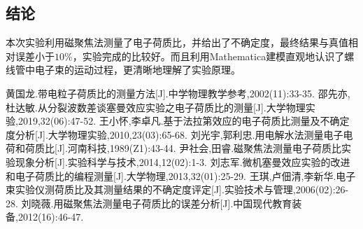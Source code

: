 \documentclass{WHUReport}
\begin{document}
\begin{multicols}{2}
	\section{结\quad 论}
	本次实验利用磁聚焦法测量了电子荷质比，并给出了不确定度，最终结果与真值相对误差小于$10\%$，实验完成的比较好。而且利用Mathematica建模直观地认识了螺线管中电子束的运动过程，更清晰地理解了实验原理。
	
	\begin{thebibliography}{99}  
		黄国龙.带电粒子荷质比的测量方法[J].中学物理教学参考,2002(11):33-35.
		邵先亦,杜达敏.从分裂波数差谈塞曼效应实验之电子荷质比的测量[J].大学物理实验,2019,32(06):47-52.
		王小怀,李卓凡.基于法拉第效应的电子荷质比测量及不确定度分析[J].大学物理实验,2010,23(03):65-68.
		刘光宇,郭利忠.用电解水法测量电子电荷和荷质比[J].河南科技,1989(Z1):43-44.
		尹社会,田睿.磁聚焦法测量电子荷质比实验现象分析[J].实验科学与技术,2014,12(02):1-3.
		刘志军.微机塞曼效应实验的改进和电子荷质比的编程测量[J].大学物理,2013,32(01):25-29.
		王琪,卢佃清,李新华.电子束实验仪测荷质比及其测量结果的不确定度评定[J].实验技术与管理,2006(02):26-28.
		刘晓薇.用磁聚焦法测量电子荷质比的误差分析[J].中国现代教育装备,2012(16):46-47.
	\end{thebibliography}
\end{multicols}
\end{document}
